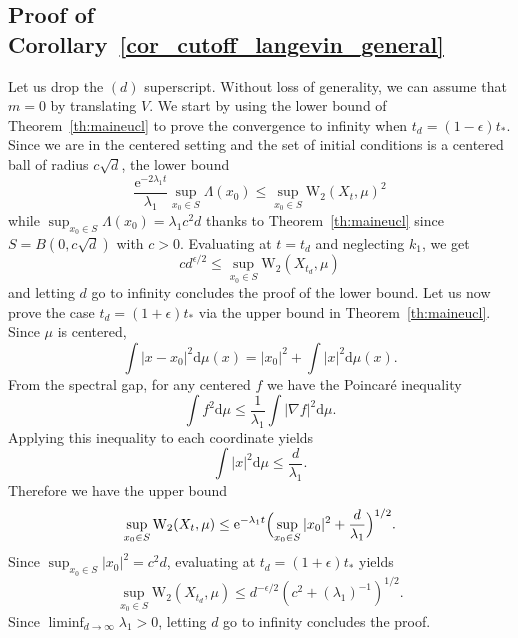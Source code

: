 \documentclass[10pt,reqno]{amsart}
\numberwithin{equation}{section}
\begin{document}
\subsection{Proof of Corollary~\ref{cor_cutoff_langevin_general}}

Let us drop the $(d)$ superscript. Without loss of generality, we can assume
that $m = 0$ by translating $V$. We start by using the lower bound
of Theorem~\ref{th:maineucl} to prove the convergence to infinity when
$t_d = (1-\epsilon)t_*$. Since we are in the centered setting and the set of
initial conditions is a centered ball of radius $c\sqrt{d}$, the lower bound
\begin{equation}
  \frac{\mathrm{e}^{-2\lambda_1 t}}{\lambda_1}\sup_{x_0\in S}\Lambda(x_0) 
  \leq \sup_{x_0\in S}\mathrm{W}_2(X_t, \mu)^2
\end{equation}
while $\sup_{x_0\in S}\Lambda(x_0)=\lambda_1c^2d$ thanks to
Theorem~\ref{th:maineucl} since $S=B(0,c\sqrt d)$ with $c>0$. Evaluating at
$t = t_d$ and neglecting $k_1$, we get
\begin{equation}
  cd^{\epsilon/2} \leq \sup_{x_0\in S}\mathrm{W}_2(X_{t_d}, \mu)
\end{equation}
and letting $d$ go to infinity concludes the proof of the lower bound. Let us
now prove the case $t_d = (1+\epsilon)t_*$ via the upper bound in
Theorem~\ref{th:maineucl}. Since $\mu$ is centered,
\begin{equation}
  \int|x-x_0|^2\mathrm{d}\mu(x) = |x_0|^2 + \int|x|^2\mathrm{d}\mu(x).
\end{equation}
From the spectral gap, for any centered $f$ we have the Poincaré inequality
\begin{equation}
  \int f^2\mathrm{d}\mu \leq \frac{1}{\lambda_1}\int|\nabla f|^2\mathrm{d}\mu.
\end{equation}
Applying this inequality to each coordinate yields
\begin{equation}
  \int|x|^2\mathrm{d}\mu \leq \frac{d}{\lambda_1}.
\end{equation}
Therefore we have the upper bound
\begin{equation}
  \sup_{x_0\in S}\mathrm{W}_2(X_t, \mu) 
  \leq \mathrm{e}^{-\lambda_1 t}\Bigl(\sup_{x_0\in S} |x_0|^2 + \frac{d}{\lambda_1}\Bigr)^{1/2}.
\end{equation}
Since $\sup_{x_0\in S} |x_0|^2 = c^2d$, evaluating at $t_d = (1+\epsilon)t_*$ yields
\begin{equation}
  \sup_{x_0\in S}
  \mathrm{W}_2(X_{t_d}, \mu) 
  \leq d^{-\epsilon/2}(c^2+(\lambda_1)^{-1})^{1/2}.
\end{equation}
Since $\liminf_{d\to\infty}\lambda_1 > 0$, letting $d$ go to infinity concludes the proof. 
\end{document}

